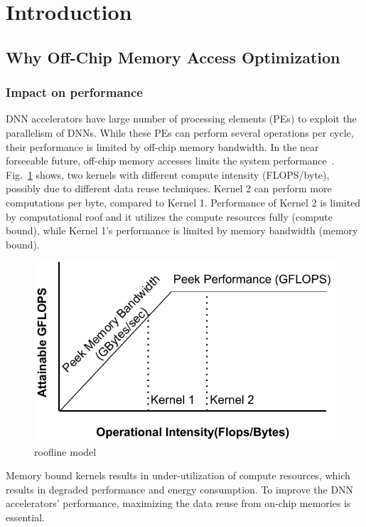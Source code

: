 \documentclass[a4paper,10pt]{article}
\begin{document}

\section{Introduction}

\subsection{Why Off-Chip Memory Access Optimization}
\subsubsection{Impact on performance}
DNN accelerators have large number of processing elements (PEs) to exploit the parallelism of DNNs. While these PEs can perform several operations per cycle, their performance is limited by off-chip memory bandwidth. In the near forseeable future, off-chip memory accesses limits the system performance~\cite{williams2009roofline}. Fig.~\ref{fig:roofline} shows, two kernels with different compute intensity (FLOPS/byte), possibly due to different data reuse techniques. Kernel 2 can perform more computations per byte, compared to Kernel 1. Performance of Kernel 2 is limited by computational roof and it utilizes the compute resources fully (compute bound), while Kernel 1's performance is limited by memory bandwidth (memory bound).
\begin{figure}[!htb]
	\centering
	\includegraphics[width=0.6\linewidth]{./images/roofline}
	\caption{roofline model}
	\label{fig:roofline}
\end{figure}
Memory bound kernels results in under-utilization of compute resources, which results in degraded performance and energy consumption. To improve the DNN accelerators' performance, maximizing the data reuse from on-chip memories is essential.
\end{document}
